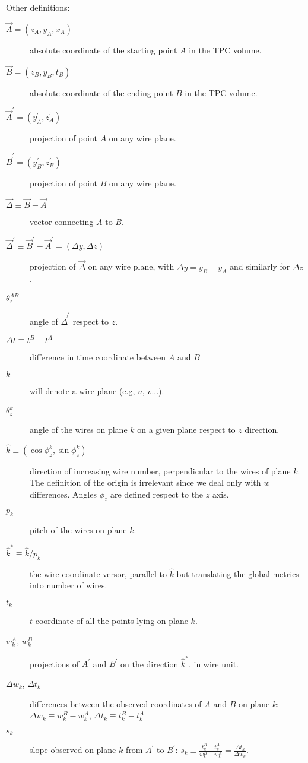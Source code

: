 \documentclass{article}
\newcommand{\MathSym}[1]{\ensuremath{#1}\xspace}
\providecommand{\defined}{\ensuremath{\equiv}}
\DeclareRobustCommand{\brackets}[1]{\ensuremath{\left(#1\right)}}
\newcommand{\eg}{e.g\punct}
\newcommand{\thetaDeltaP}{\MathSym{\theta_{z}^{AB}}}
\begin{document}
	Other definitions:
	\begin{description}
		\item[$\vec{A} = \brackets{ z_{A}, y_{A}, x_{A}}$] absolute coordinate of the starting point $A$ in the TPC volume.
		\item[$\vec{B} = \brackets{ z_{B}, y_{B}, t_{B} }$] absolute coordinate of the ending point $B$ in the TPC volume.
		\item[$\vec{A}^{\prime} = \brackets{ y^{\prime}_{A}, z^{\prime}_{A} }$] projection of point $A$ on any wire plane.
		\item[$\vec{B}^{\prime} = \brackets{ y^{\prime}_{B}, z^{\prime}_{B} }$] projection of point $B$ on any wire plane.
		\item[$\vec{\Delta} \defined \vec{B} - \vec{A}$] vector connecting $A$ to $B$.
		\item[$\vec{\Delta}^{\prime} \defined \vec{B}^{\prime} - \vec{A}^{\prime} = \brackets{ \Delta y, \Delta z }$] projection of $\vec{\Delta}$ on any wire plane, with $\Delta y = y_{B} - y_{A}$ and similarly for $\Delta z$.
		\item[$\thetaDeltaP$] angle of $\vec{\Delta}^{\prime}$ respect to $z$.
		\item[$\Delta t \defined t^{B} - t^{A}$] difference in time coordinate between $A$ and $B$
		\item[$k$] will denote a wire plane (\eg, $u$, $v$...).
		\item[$\theta_{z}^{k}$] angle of the wires on plane $k$ on a given plane respect to $z$ direction.
		\item[$\hat{k} \defined \brackets{\cos \phi^{k}_{z}, \sin \phi^{k}_{z}}$] direction of increasing wire number, perpendicular to the wires of plane $k$. The definition of the origin is irrelevant since we deal only with $w$ differences. Angles $\phi_{z}$ are defined respect to the $z$ axis.
		\item[$p_{k}$] pitch of the wires on plane $k$.
		\item[$\hat{k}^{*} \defined \hat{k} / p_{k}$] the wire coordinate versor, parallel to $\hat{k}$ but translating the global metrics into number of wires.
		\item[$t_{k}$] $t$ coordinate of all the points lying on plane $k$.
		\item[$w^{A}_{k}$, $w^{B}_{k}$] projections of $A^{\prime}$ and $B^{\prime}$ on the direction $\hat{k}^{*}$, in wire unit.
		\item[$\Delta w_{k}$, $\Delta t_{k}$] differences between the observed coordinates of $A$ and $B$ on plane $k$: $\Delta w_{k} \defined w^{B}_{k} - w^{A}_{k}$, $\Delta t_{k} \defined t^{B}_{k} - t^{A}_{k}$
		\item[$s_{k}$] slope observed on plane $k$ from $A^{\prime}$ to $B^{\prime}$: $s_{k} \defined \frac{t^{B}_{k} - t^{A}_{k}}{w^{B}_{k} - w^{A}_{k}} = \frac{\Delta t_{k}}{\Delta w_{k}}$.
		
	\end{description}
	
\end{document}
